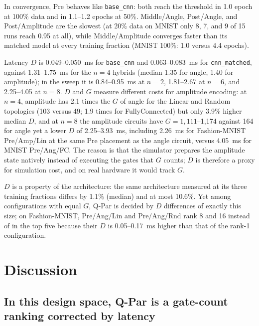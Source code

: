 \documentclass{ieeeaccess}
\begin{document}
In convergence, Pre behaves like \texttt{base\_cnn}: both reach the threshold in 1.0 epoch at 100\% data and in 1.1--1.2 epochs at 50\%. Middle/Angle, Post/Angle, and Post/Amplitude are the slowest (at 20\% data on MNIST only 8, 7, and 9 of 15 runs reach 0.95 at all), while Middle/Amplitude converges faster than its matched model at every training fraction (MNIST 100\%: 1.0 versus 4.4 epochs).

Latency $D$ is 0.049--0.050~ms for \texttt{base\_cnn} and 0.063--0.083~ms for \texttt{cnn\_matched}, against 1.31--1.75~ms for the $n = 4$ hybrids (median 1.35 for angle, 1.40 for amplitude); in the sweep it is 0.84--0.95~ms at $n = 2$, 1.81--2.67 at $n = 6$, and 2.25--4.05 at $n = 8$. $D$ and $G$ measure different costs for amplitude encoding: at $n = 4$, amplitude has 2.1 times the $G$ of angle for the Linear and Random topologies (103 versus 49; 1.9 times for FullyConnected) but only 3.9\% higher median $D$, and at $n = 8$ the amplitude circuits have $G = 1{,}111$--1,174 against 164 for angle yet a lower $D$ of 2.25--3.93~ms, including 2.26~ms for Fashion-MNIST Pre/Amp/Lin at the same Pre placement as the angle circuit, versus 4.05~ms for MNIST Pre/Ang/FC. The reason is that the simulator prepares the amplitude state natively instead of executing the gates that $G$ counts; $D$ is therefore a proxy for simulation cost, and on real hardware it would track $G$.

$D$ is a property of the architecture: the same architecture measured at its three training fractions differs by 1.1\% (median) and at most 10.6\%. Yet among configurations with equal $G$, Q-Par is decided by $D$ differences of exactly this size; on Fashion-MNIST, Pre/Ang/Lin and Pre/Ang/Rnd rank 8 and 16 instead of in the top five because their $D$ is 0.05--0.17~ms higher than that of the rank-1 configuration.

\section{Discussion}
\label{sec:discussion}

\subsection{In this design space, Q-Par is a gate-count ranking corrected by latency}
\label{sec:disc-gate}
\end{document}
